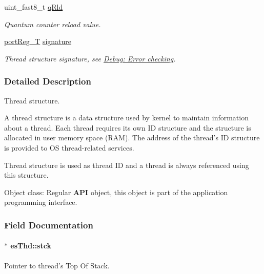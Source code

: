 \begin{DoxyCompactItemize}
uint\-\_\-fast8\-\_\-t \hyperlink{structesThd_a3c2c5e4b699e3c990e37000650f031ba}{q\-Rld}
\begin{DoxyCompactList}\small\item\em Quantum counter reload value. \end{DoxyCompactList}\item 
\hyperlink{group__template__cpu__intf_ga99980ab56ce9857e7380210d12e3d41f}{port\-Reg\-\_\-\-T} \hyperlink{structesThd_a72e6c4660e827aae5a621894756a5eb2}{signature}
\begin{DoxyCompactList}\small\item\em Thread structure signature, see \hyperlink{errors}{Debug\-: Error checking}. \end{DoxyCompactList}\end{DoxyCompactItemize}


\subsubsection{Detailed Description}
Thread structure. 

A thread structure is a data structure used by kernel to maintain information about a thread. Each thread requires its own I\-D structure and the structure is allocated in user memory space (R\-A\-M). The address of the thread’s I\-D structure is provided to O\-S thread-\/related services.

Thread structure is used as thread I\-D and a thread is always referenced using this structure. \begin{DoxyParagraph}{Object class\-:}
Regular {\bfseries A\-P\-I} object, this object is part of the application programming interface. 
\end{DoxyParagraph}


\subsubsection{Field Documentation}
\hypertarget{structesThd_a5a7906c650bc81f3f0639f6f8565316b}{
\paragraph[{stck}]{$\ast$ es\-Thd\-::stck}}\label{structesThd_a5a7906c650bc81f3f0639f6f8565316b}


Pointer to thread's Top Of Stack. 

